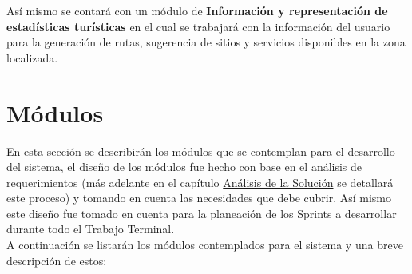 Así mismo se contará con un módulo de \textbf{Información y representación de estadísticas turísticas} en el cual se trabajará con la información del usuario para la generación de rutas, sugerencia de sitios y servicios disponibles en la zona localizada.

\section{Módulos}

En esta sección se describirán los módulos que se contemplan para el desarrollo del sistema, el diseño de los módulos fue hecho con base en el análisis de requerimientos (más adelante en el capítulo \hyperlink{cv:analisisSolucion}{Análisis de la Solución} se detallará este proceso) y tomando en cuenta las necesidades que debe cubrir. Así mismo este diseño fue tomado en cuenta para la planeación de los Sprints a desarrollar durante todo el Trabajo Terminal. \\

A continuación se listarán los módulos contemplados para el sistema y una breve descripción de estos:

